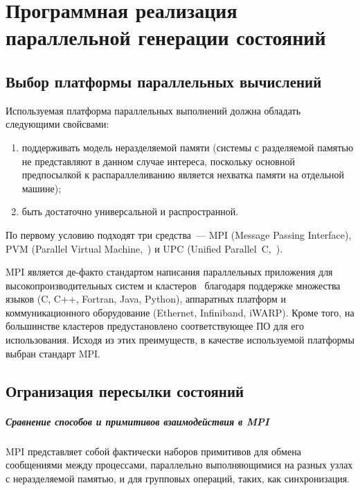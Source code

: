 \chapter{Программная реализация параллельной генерации состояний}
\label{cha:communication}

\section{Выбор платформы параллельных вычислений}
\label{sec:parall-selection}

Используемая платформа параллельных выполнений должна обладать следующими свойсвами:
\begin{enumerate}
\item поддерживать модель неразделяемой памяти (системы с разделяемой памятью не
  представляют в данном случае интереса, поскольку основной предпосылкой к
  распараллеливанию является нехватка памяти на отдельной машине);
\item быть достаточно универсальной и распространной.
\end{enumerate}

По первому условию подходят три средства~--- MPI (Message Passing Interface), PVM (Parallel
Virtual Machine,~\cite{PVM}) и UPC (Unified Parallel~C,~\cite{UPC12}).

MPI является де-факто стандартом написания параллельных приложения для
высокопроизводительных систем и кластеров~\cite{MPI} благодаря поддержке множества языков
(C, C++, Fortran, Java, Python\etc), аппаратных платформ и коммуникационного оборудование
(Ethernet, Infiniband, iWARP\etc). Кроме того, на большинстве кластеров предустановлено
соответствующее ПО для его использования. Исходя из этих преимуществ, в качестве
используемой платформы выбран стандарт MPI.

\section{Огранизация пересылки состояний}
\label{sec:mpi-interaction}

\paragraph{Сравнение способов и примитивов взаимодействия в MPI}

MPI представляет собой фактически наборов примитивов для обмена сообщениями между
процессами, параллельно выполняющимися на разных узлах с неразделяемой памятью, и для
групповых операций, таких, как синхронизация.

